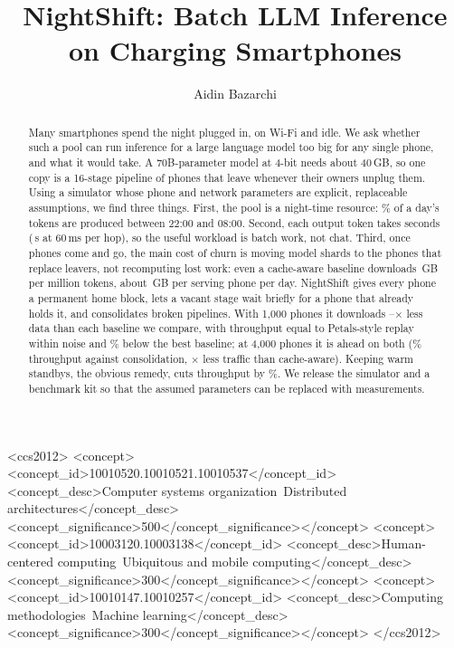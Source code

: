 \documentclass[sigconf,nonacm]{acmart}
\begin{document}
\title{NightShift: Batch LLM Inference on Charging Smartphones}

\author{Aidin Bazarchi}

\begin{abstract}
Many smartphones spend the night plugged in, on Wi-Fi and idle.
We ask whether such a pool can run inference for a large language model too
big for any single phone, and what it would take. A 70B-parameter model at
4-bit needs about 40\,GB, so one copy is a 16-stage pipeline of phones that
leave whenever their owners unplug them. Using a simulator whose phone and
network parameters are explicit, replaceable assumptions, we find three
things. First, the pool is a night-time resource: \NightSharePct\% of a day's
tokens are produced between 22:00 and 08:00. Second, each output token takes
seconds (\LatWAN\,s at 60\,ms per hop), so the useful workload is batch work,
not chat. Third, once phones come and go, the main cost of churn is moving
model shards to the phones that replace leavers, not recomputing lost work:
even a cache-aware baseline downloads \GBCA\,GB per million tokens, about
\PhoneGBCA\,GB per serving phone per day. NightShift gives every phone a
permanent home block, lets a vacant stage wait briefly for a phone that
already holds it, and consolidates broken pipelines. With 1,000 phones it
downloads \GBRatioBaseMin--\GBRatioBaseMax$\times$ less data than each
baseline we compare, with throughput equal to Petals-style replay within noise
and \NSbehindConsolPct\% below the best baseline; at 4,000 phones it is ahead on
both (\PoolLargeVsConsolPct\% throughput against consolidation,
\PoolLargeGBRatioCA$\times$ less traffic than cache-aware).
Keeping warm standbys, the obvious remedy, cuts throughput by
\StandbyDropPct\%. We release the simulator and a benchmark kit so that the
assumed parameters can be replaced with measurements.
\end{abstract}

\begin{CCSXML}
<ccs2012>
<concept><concept_id>10010520.10010521.10010537</concept_id>
<concept_desc>Computer systems organization~Distributed architectures</concept_desc>
<concept_significance>500</concept_significance></concept>
<concept><concept_id>10003120.10003138</concept_id>
<concept_desc>Human-centered computing~Ubiquitous and mobile computing</concept_desc>
<concept_significance>300</concept_significance></concept>
<concept><concept_id>10010147.10010257</concept_id>
<concept_desc>Computing methodologies~Machine learning</concept_desc>
<concept_significance>300</concept_significance></concept>
</ccs2012>
\end{CCSXML}
\end{document}
